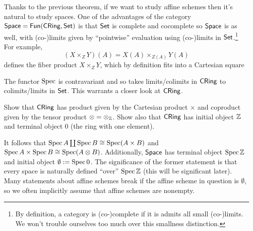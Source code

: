 \documentclass[11pt]{article}
\begin{document}
Thanks to the previous theorem, if we want to study affine schemes then it's natural to study spaces. One of the advantages of the category $\operatorname{\mathsf{Space}}=\operatorname{\mathsf{Fun}}(\operatorname{\mathsf{CRing}},\operatorname{\mathsf{Set}})$ is that $\operatorname{\mathsf{Set}}$ is complete and cocomplete so $\operatorname{\mathsf{Space}}$ is as well, with (co-)limits given by ``pointwise'' evaluation using (co-)limits in $\operatorname{\mathsf{Set}}$.\footnote{By definition, a category is (co-)complete if it is admits all small (co-)limits. We won't trouble ourselves too much over this smallness distinction.} For example,
$$(X\times_ZY)(A)=X(A)\times_{Z(A)}Y(A)$$
defines the fiber product $X\times_ZY$, which by definition fits into a Cartesian square
\begin{center}
\end{center}
The functor $\operatorname{Spec}$ is contravariant and so takes limits/colimits in $\operatorname{\mathsf{CRing}}$ to colimits/limits in $\operatorname{\mathsf{Set}}$. This warrants a closer look at $\operatorname{\mathsf{CRing}}$.

\begin{exercise}
Show that $\operatorname{\mathsf{CRing}}$ has product given by the Cartesian product $\times$ and coproduct given by the tensor product $\otimes=\otimes_{\mathbb{Z}}$. Show also that $\operatorname{\mathsf{CRing}}$ has initial object $\mathbb{Z}$ and terminal object $0$ (the ring with one element).
\end{exercise}

It follows that $\operatorname{Spec} A\coprod\operatorname{Spec} B\cong\operatorname{Spec}(A\times B)$ and $\operatorname{Spec} A\times\operatorname{Spec} B\cong\operatorname{Spec}(A\otimes B)$. Additionally, $\operatorname{\mathsf{Space}}$ has terminal object $\operatorname{Spec}\mathbb{Z}$ and initial object $\emptyset:=\operatorname{Spec}0$. The significance of the former statement is that every space is naturally defined ``over'' $\operatorname{Spec}\mathbb{Z}$ (this will be significant later). Many statements about affine schemes break if the affine scheme in question is $\emptyset$, so we often implicitly assume that affine schemes are nonempty.
\end{document}
